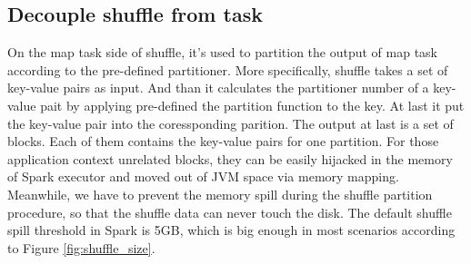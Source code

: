 \documentclass[10pt,twocolumn]{article}
\begin{document}
\subsection{Decouple shuffle from task}
On the map task side of shuffle, it's used to partition the output of map task according to the pre-defined partitioner. More specifically, shuffle takes a set of key-value pairs as input. And than it calculates the partitioner number of a key-value pait by applying pre-defined the partition function to the key. At last it put the key-value pair into the coressponding parition. The output at last is a set of blocks. Each of them contains the key-value pairs for one partition. For those application context unrelated blocks, they can be easily hijacked in the memory of Spark executor and moved out of JVM space via memory mapping. Meanwhile, we have to prevent the memory spill during the shuffle partition procedure, so that the shuffle data can never touch the disk. The default shuffle spill threshold in Spark is 5GB\cite{sparksource}, which is big enough in most scenarios according to Figure \ref{fig:shuffle_size}.
\end{document}

